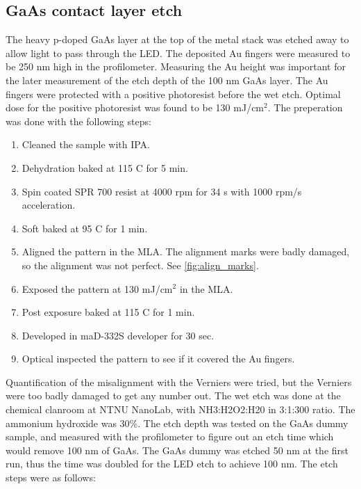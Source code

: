 \subsection{GaAs contact layer etch}
\label{methods:wet_etch}
The heavy p-doped GaAs layer at the top of the metal stack was etched away to allow light to pass through the LED.
The deposited Au fingers were measured to be 250 nm high in the profilometer.
Measuring the Au height was important for the later measurement of the etch depth of the 100 nm GaAs layer.
The Au fingers were protected with a positive photoresist before the wet etch.
Optimal dose for the positive photoresist was found to be 130 mJ/cm$^2$.
The preperation was done with the following steps:
\begin{enumerate}
    \item Cleaned the sample with IPA.
    \item Dehydration baked at 115 \textdegree C for 5 min.
    \item Spin coated SPR 700 resist at 4000 rpm for 34 s with 1000 rpm/s acceleration.
    \item Soft baked at 95 \textdegree C for 1 min.
    \item Aligned the pattern in the MLA. The alignment marks were badly damaged, so the alignment was not perfect. See \autoref{fig:align_marks}.
    \item Exposed the pattern at 130 mJ/cm$^2$ in the MLA.
    \item Post exposure baked at 115 \textdegree C for 1 min.
    \item Developed in maD-332S developer for 30 sec.
    \item Optical inspected the pattern to see if it covered the Au fingers.
\end{enumerate}

Quantification of the misalignment with the Verniers were tried, but the Verniers were too badly damaged to get any number out.
The wet etch was done at the chemical clanroom at NTNU NanoLab, with NH3:H2O2:H20 in 3:1:300 ratio.
The ammonium hydroxide was 30\%.
The etch depth was tested on the GaAs dummy sample, and measured with the profilometer to figure out an etch time which would remove 100 nm of GaAs.
The GaAs dummy was etched 50 nm at the first run, thus the time was doubled for the LED etch to achieve 100 nm.
The etch steps were as follows:

